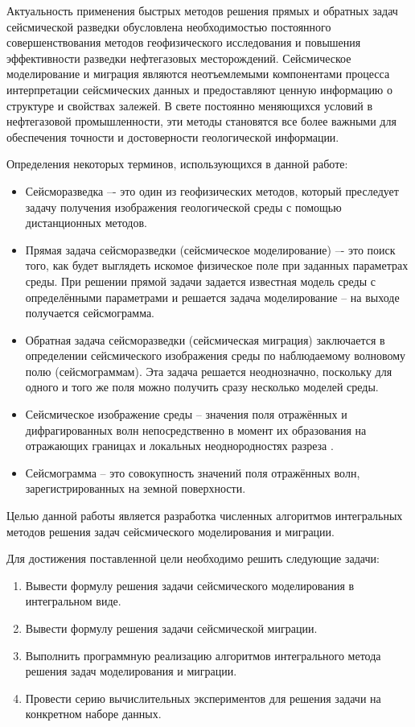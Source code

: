 \documentclass[a4paper, fontsize=14pt]{article}
\begin{document}
	Актуальность применения быстрых методов решения прямых и обратных задач сейсмической разведки обусловлена необходимостью постоянного совершенствования методов геофизического исследования и повышения эффективности разведки нефтегазовых месторождений. Сейсмическое моделирование и миграция являются неотъемлемыми компонентами процесса интерпретации сейсмических данных и предоставляют ценную информацию о структуре и свойствах залежей. В свете постоянно меняющихся условий в нефтегазовой промышленности, эти методы становятся все более важными для обеспечения точности и достоверности геологической информации.
	
	Определения некоторых терминов, использующихся в данной работе:
	\begin{itemize}
		\item Сейсморазведка –- это один из геофизических методов, который преследует задачу
		получения изображения геологической среды с помощью дистанционных методов. 
		
		\item Прямая задача сейсморазведки (сейсмическое моделирование) –- это поиск того, как будет выглядеть 
		искомое физическое поле при заданных параметрах среды. При решении прямой задачи 
		задается известная модель среды с определёнными параметрами и решается задача
		моделирование – на выходе получается сейсмограмма.
		
		\item Обратная задача сейсморазведки (сейсмическая миграция) заключается в определении сейсмического изображения среды по
		наблюдаемому волновому полю (сейсмограммам). Эта задача решается неоднозначно,
		поскольку для одного и того же поля можно получить сразу несколько моделей среды.
		
		\item Сейсмическое изображение среды --  значения поля 	отражённых и дифрагированных волн непосредственно в момент их образования на отражающих границах и локальных неоднородностях	разреза \cite{timoshin}.
		
		\item Сейсмограмма -- это совокупность значений поля отражённых волн, зарегистрированных на земной поверхности.   
	\end{itemize}

	
	Целью данной работы является разработка численных алгоритмов интегральных методов решения задач сейсмического моделирования и миграции. 
	
	Для достижения поставленной цели необходимо решить следующие задачи:
	\begin{enumerate}
		\item Вывести формулу решения задачи сейсмического моделирования в интегральном виде.
		\item Вывести формулу решения задачи сейсмической миграции.
		\item Выполнить программную реализацию алгоритмов интегрального метода решения задач моделирования и миграции.
		\item Провести серию вычислительных экспериментов для решения задачи на конкретном наборе данных.
	\end{enumerate}
\end{document}
